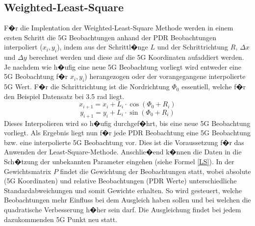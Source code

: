 \subsection{Weighted-Least-Square}
F�r die Implentation der Weighted-Least-Square Methode werden in einem ersten Schritt die 5G Beobachtungen anhand der PDR Beobachtungen interpoliert ($x_i, y_i$), indem aus der Schrittl�nge $L$ und der Schrittrichtung $R$, $\Delta x$ und $\Delta y$ berechnet werden und diese auf die 5G Koordinaten aufaddiert werden.
Je nachdem wie h�ufig eine neue 5G Beobachtung vorliegt wird entweder eine 5G Beobachtung f�r $x_i, y_i$) herangezogen oder der vorangegangene interpolierte 5G Wert. F�r die Schrittrichtung ist die Nordrichtung $\Phi_0$ essentiell, welche f�r den Beispiel Datensatz bei 3.5 rad liegt.
\begin{equation}
x_{i+1} = x_i + L_i \cdot \cos(\Phi_0 + R_i)
\end{equation}
\begin{equation}
y_{i+1} = y_i + L_i \cdot \sin(\Phi_0 + R_i)
\end{equation}
Dieses Interpolieren wird so h�ufig durchgef�hrt, bis eine neue 5G Beobachtung vorliegt. Als Ergebnis liegt nun f�r jede PDR Beobachtung eine 5G Beobachtung bzw. eine interpolierte 5G Beobachtung vor. Dies ist die Voraussetzung f�r das Anwenden der Least-Square-Methode. Anschlie�end k�nnen die Daten in die Sch�tzung der unbekannten Parameter eingehen (siehe Formel \ref{LS}). In der Gewichtsmatrix $P$ findet die Gewichtung der Beobachtungen statt, wobei absolute (5G Koordinaten) und relative Beobachtungen (PDR Werte) unterschiedliche Standardabweichungen und somit Gewichte erhalten. So wird gesteuert, welche Beobachtungen mehr Einfluss bei dem Ausgleich haben sollen und bei welchen die quadratische Verbesserung h�her sein darf. Die Ausgleichung findet bei jedem dazukommenden 5G Punkt neu statt. 

